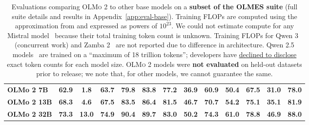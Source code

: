 \documentclass[table]{ai2style/ai2}
\newcommand{\olmotoo}{\textsc{OLMo 2}\xspace}
\begin{document}
\begin{table}[ht!]
\begin{center}
\begin{small}
\begin{tabular}{lcc|cccccc|cccc}
\rowcolor{ai2lightpink} \textbf{OLMo 2 7B} & \textbf{62.9} & \textbf{1.8} & \textbf{63.7} & \textbf{79.8} & \textbf{83.8} & \textbf{77.2} & \textbf{36.9} & \textbf{60.9} & \textbf{50.4} & \textbf{67.5} & \textbf{31.0} & \textbf{78.0} \\
\rowcolor{ai2lightpink} \textbf{OLMo 2 13B} & \textbf{68.3} & \textbf{4.6} & \textbf{67.5} & \textbf{83.5} & \textbf{86.4} & \textbf{81.5} & \textbf{46.7} & \textbf{70.7} & \textbf{54.2} & \textbf{75.1} & \textbf{35.1} & \textbf{81.9} \\
\rowcolor{ai2lightpink} \textbf{OLMo 2 32B} & \textbf{73.3} & \textbf{13.0} & \textbf{74.9} & \textbf{90.4} & \textbf{89.7} & \textbf{83.0} & \textbf{50.2} & \textbf{74.3} & \textbf{61.0} & \textbf{78.8} & \textbf{46.9} & \textbf{88.0} \\
\bottomrule
\end{tabular}
\end{small}
\vspace{2mm}
  \caption{
  Evaluations comparing \olmotoo to other base models on a {\bf subset of the OLMES suite} (full suite details and results in Appendix~\ref{app:eval-base}).
  Training FLOPs are computed using the approximation from \citet{kaplan2020scaling} and expressed as powers of $10^{23}$.
  We could not estimate compute for any Mistral model~\citep{jiang2023mistral,mistralnemo} because their total training token count is unknown. 
  Training FLOPs for Qwen 3~\citep{yang2025qwen3technicalreport} (concurrent work) and Zamba 2~\citep{zamba2_model} are not reported due to difference in architecture. 
  Qwen 2.5 models~\citep{qwen2.5} are trained on a ``maximum of 18 trillion tokens''; developers have \href{https://web.archive.org/web/20241125024509/https://github.com/QwenLM/Qwen2.5/issues/562}{declined to disclose} exact token counts for each model size. 
  \olmotoo models were {\bf not evaluated} on held-out datasets prior to release; 
  we note that, for other models, we cannot guarantee the same. 
  }
\label{tab:evals_overview}
\end{center}
\end{table}
\end{document}
